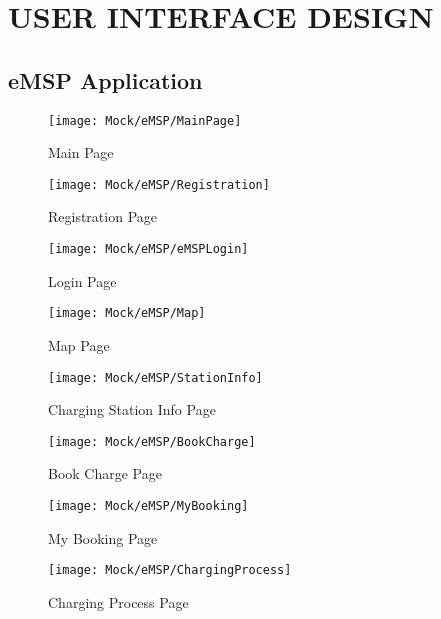 \newcommand\case{\stepcounter{case}\arabic{case}}
\chapter{USER INTERFACE DESIGN}
\label{ch:interfaceDesign}%
\section{eMSP Application}

\begin{figure}[H]
    \begin{minipage}[t]{.45\textwidth} %
    \texttt{[image: Mock/eMSP/MainPage]}
    \caption{Main Page}
    \label{fig:MainPage}
\end{minipage}
\hfill
\begin{minipage}[t]{.45\textwidth}
    \texttt{[image: Mock/eMSP/Registration]}
    \caption{Registration Page}
    \label{fig:Registration}
\end{minipage}
\end{figure}

\begin{figure}[H]
    \begin{minipage}[t]{.45\textwidth} %
    \texttt{[image: Mock/eMSP/eMSPLogin]}
    \caption{Login Page}
    \label{fig:eMSPLogin}
\end{minipage}
\hfill
\begin{minipage}[t]{.45\textwidth}
    \texttt{[image: Mock/eMSP/Map]}
    \caption{Map Page}
    \label{fig:Map}
\end{minipage}
\end{figure}
\begin{figure}[H]
    \begin{minipage}[t]{.45\textwidth} %
    \texttt{[image: Mock/eMSP/StationInfo]}
    \caption{Charging Station Info Page}
    \label{fig:StationInfo}
\end{minipage}
\hfill
\begin{minipage}[t]{.45\textwidth}
    \texttt{[image: Mock/eMSP/BookCharge]}
    \caption{Book Charge Page}
    \label{fig:BookCharge}
\end{minipage}
\end{figure}
\begin{figure}[H]
    \begin{minipage}[t]{.45\textwidth} %
    \texttt{[image: Mock/eMSP/MyBooking]}
    \caption{My Booking Page}
    \label{fig:MyBooking}
\end{minipage}
\hfill
\begin{minipage}[t]{.45\textwidth}
    \texttt{[image: Mock/eMSP/ChargingProcess]}
    \caption{Charging Process Page}
    \label{fig:ChargingProcess}
\end{minipage}
\end{figure}

